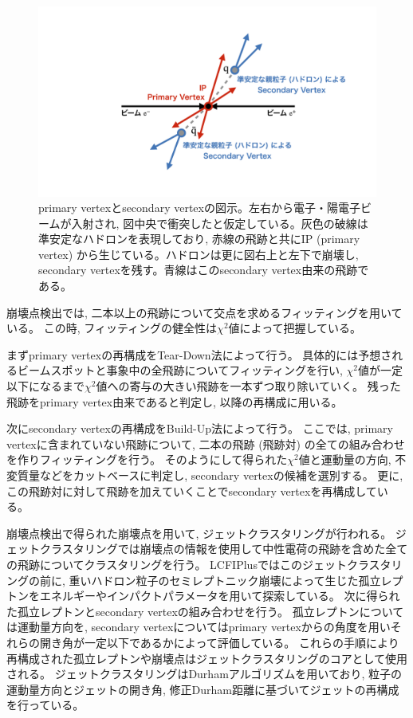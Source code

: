 \begin{figure}[htbp]
 \centering
 \includegraphics[trim = 0 100 0 100, width=1.0\textwidth, clip]{Figure/1Introduction/6ReconstructedVertex.png}
 \caption[primary vertexとsecondary vertexの図示]{primary vertexとsecondary vertexの図示。左右から電子・陽電子ビームが入射され, 図中央で衝突したと仮定している。灰色の破線は準安定なハドロンを表現しており, 赤線の飛跡と共にIP (primary vertex) から生じている。ハドロンは更に図右上と左下で崩壊し, secondary vertexを残す。青線はこのsecondary vertex由来の飛跡である。}
 \label{6ReconstructedVertex}
\end{figure}

崩壊点検出では, 二本以上の飛跡について交点を求めるフィッティングを用いている。
この時, フィッティングの健全性は$\chi^2$値によって把握している。

まずprimary vertexの再構成をTear-Down法によって行う。
具体的には予想されるビームスポットと事象中の全飛跡についてフィッティングを行い, $\chi^2$値が一定以下になるまで$\chi^2$値への寄与の大きい飛跡を一本ずつ取り除いていく。
残った飛跡をprimary vertex由来であると判定し, 以降の再構成に用いる。

次にsecondary vertexの再構成をBuild-Up法によって行う。
ここでは, primary vertexに含まれていない飛跡について, 二本の飛跡 (飛跡対) の全ての組み合わせを作りフィッティングを行う。
そのようにして得られた$\chi^2$値と運動量の方向, 不変質量などをカットベースに判定し, secondary vertexの候補を選別する。
更に, この飛跡対に対して飛跡を加えていくことでsecondary vertexを再構成している。

崩壊点検出で得られた崩壊点を用いて, ジェットクラスタリングが行われる。
ジェットクラスタリングでは崩壊点の情報を使用して中性電荷の飛跡を含めた全ての飛跡についてクラスタリングを行う。
LCFIPlusではこのジェットクラスタリングの前に, 重いハドロン粒子のセミレプトニック崩壊によって生じた孤立レプトンをエネルギーやインパクトパラメータを用いて探索している。
次に得られた孤立レプトンとsecondary vertexの組み合わせを行う。
孤立レプトンについては運動量方向を, secondary vertexについてはprimary vertexからの角度を用いそれらの開き角が一定以下であるかによって評価している。
これらの手順により再構成された孤立レプトンや崩壊点はジェットクラスタリングのコアとして使用される。
ジェットクラスタリングはDurhamアルゴリズムを用いており, 粒子の運動量方向とジェットの開き角, 修正Durham距離に基づいてジェットの再構成を行っている。

